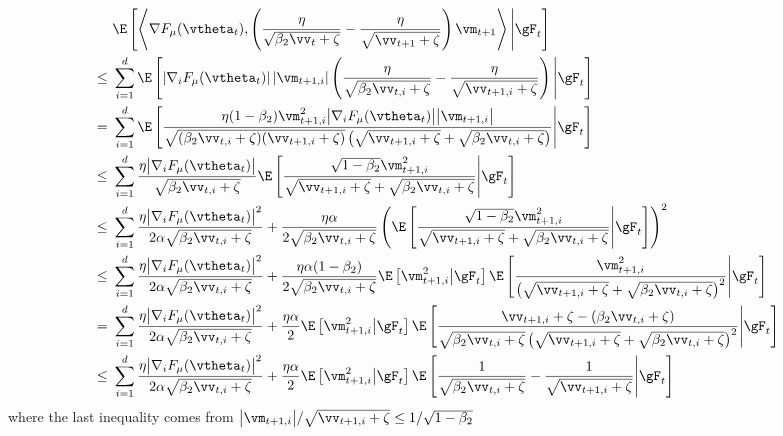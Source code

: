 \begin{equation}
\begin{aligned}
&\,\,\E\left[\left\langle\nabla F_{\mu}(\vtheta_t), \left(\frac{\eta}{\sqrt{\beta_2\vv_t + \zeta}} - \frac{\eta}{\sqrt{\vv_{t+1} + \zeta}}\right) \vm_{t+1}\right\rangle \Bigg| \gF_t\right] \\
\leq&\,\,\sum_{i=1}^d\E\left[\left|\nabla_i F_{\mu}(\vtheta_t)\right|\left|\vm_{t+1,i}\right|\left(\frac{\eta}{\sqrt{\beta_2\vv_{t,i} + \zeta}} - \frac{\eta}{\sqrt{\vv_{t+1,i} + \zeta}}\right) \Bigg| \gF_t\right] \\
=&\,\,\sum_{i=1}^d\E\left[ \frac{\eta(1-\beta_2)\vm^2_{t+1,i} \big|\nabla_i F_{\mu}(\vtheta_t)\big|\big|\vm_{t+1,i}\big|}{\sqrt{(\beta_2\vv_{t,i} + \zeta)(\vv_{t+1,i} + \zeta)}\left(\sqrt{\vv_{t+1,i}+\zeta} + \sqrt{\beta_2\vv_{t,i}+\zeta}\right)} \Bigg| \gF_t\right] \\
\leq&\,\,\sum_{i=1}^d\frac{\eta\big|\nabla_i F_{\mu}(\vtheta_t)\big|}{\sqrt{\beta_2\vv_{t,i} + \zeta}}\E\left[ \frac{\sqrt{1-\beta_2}\vm^2_{t+1,i}}{\sqrt{\vv_{t+1,i}+\zeta} + \sqrt{\beta_2\vv_{t,i}+\zeta}} \Bigg| \gF_t\right] \\
\leq&\,\,\sum_{i=1}^d\frac{\eta\big|\nabla_i F_{\mu}(\vtheta_t)\big|^2}{2\alpha\sqrt{\beta_2\vv_{t,i} + \zeta}} + \frac{\eta\alpha}{2\sqrt{\beta_2\vv_{t,i} + \zeta}}\left(\E\left[ \frac{\sqrt{1-\beta_2}\vm^2_{t+1,i}}{\sqrt{\vv_{t+1,i}+\zeta} + \sqrt{\beta_2\vv_{t,i}+\zeta}} \Bigg| \gF_t\right]\right)^2 \\
\leq&\,\,\sum_{i=1}^d\frac{\eta\big|\nabla_i F_{\mu}(\vtheta_t)\big|^2}{2\alpha\sqrt{\beta_2\vv_{t,i} + \zeta}} + \frac{\eta\alpha(1-\beta_2)}{2\sqrt{\beta_2\vv_{t,i} + \zeta}}\E\left[\vm^2_{t+1,i}\big|\gF_t\right]\E\left[ \frac{\vm^2_{t+1,i}}{\left(\sqrt{\vv_{t+1,i}+\zeta} + \sqrt{\beta_2\vv_{t,i}+\zeta}\right)^2} \Bigg| \gF_t\right] \\
=&\,\,\sum_{i=1}^d\frac{\eta\big|\nabla_i F_{\mu}(\vtheta_t)\big|^2}{2\alpha\sqrt{\beta_2\vv_{t,i} + \zeta}} + \frac{\eta\alpha}{2}\E\left[\vm^2_{t+1,i}\big|\gF_t\right]\E\left[ \frac{\vv_{t+1,i}+\zeta - (\beta_2\vv_{t,i}+\zeta)}{\sqrt{\beta_2\vv_{t,i} + \zeta}\left(\sqrt{\vv_{t+1,i}+\zeta} + \sqrt{\beta_2\vv_{t,i}+\zeta}\right)^2} \Bigg| \gF_t\right] \\
\leq&\,\,\sum_{i=1}^d\frac{\eta\big|\nabla_i F_{\mu}(\vtheta_t)\big|^2}{2\alpha\sqrt{\beta_2\vv_{t,i} + \zeta}} + \frac{\eta\alpha}{2}\E\left[\vm^2_{t+1,i}\big|\gF_t\right]\E\left[\frac{1}{\sqrt{\beta_2\vv_{t,i}+\zeta}} - \frac{1}{\sqrt{\vv_{t+1,i}+\zeta}} \Bigg| \gF_t\right]
\end{aligned}
\end{equation}
where the last inequality comes from $\big|\vm_{t+1,i}\big| / \sqrt{\vv_{t+1,i} + \zeta} \leq 1/\sqrt{1-\beta_2}$

